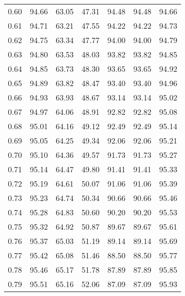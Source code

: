 \begin{tabular}{|c|c|c|c|c|c|c|}
      0.60 &     94.66 &     63.05 &      47.31 &   94.48 &      94.48 &         94.66 \\
      0.61 &     94.71 &     63.21 &      47.55 &   94.22 &      94.22 &         94.73 \\
      0.62 &     94.75 &     63.34 &      47.77 &   94.00 &      94.00 &         94.79 \\
      0.63 &     94.80 &     63.53 &      48.03 &   93.82 &      93.82 &         94.85 \\
      0.64 &     94.85 &     63.73 &      48.30 &   93.65 &      93.65 &         94.92 \\
      0.65 &     94.89 &     63.82 &      48.47 &   93.40 &      93.40 &         94.96 \\
      0.66 &     94.93 &     63.93 &      48.67 &   93.14 &      93.14 &         95.02 \\
      0.67 &     94.97 &     64.06 &      48.91 &   92.82 &      92.82 &         95.08 \\
      0.68 &     95.01 &     64.16 &      49.12 &   92.49 &      92.49 &         95.14 \\
      0.69 &     95.05 &     64.25 &      49.34 &   92.06 &      92.06 &         95.21 \\
      0.70 &     95.10 &     64.36 &      49.57 &   91.73 &      91.73 &         95.27 \\
      0.71 &     95.14 &     64.47 &      49.80 &   91.41 &      91.41 &         95.33 \\
      0.72 &     95.19 &     64.61 &      50.07 &   91.06 &      91.06 &         95.39 \\
      0.73 &     95.23 &     64.74 &      50.34 &   90.66 &      90.66 &         95.46 \\
      0.74 &     95.28 &     64.83 &      50.60 &   90.20 &      90.20 &         95.53 \\
      0.75 &     95.32 &     64.92 &      50.87 &   89.67 &      89.67 &         95.61 \\
      0.76 &     95.37 &     65.03 &      51.19 &   89.14 &      89.14 &         95.69 \\
      0.77 &     95.42 &     65.08 &      51.46 &   88.50 &      88.50 &         95.77 \\
      0.78 &     95.46 &     65.17 &      51.78 &   87.89 &      87.89 &         95.85 \\
      0.79 &     95.51 &     65.16 &      52.06 &   87.09 &      87.09 &         95.93 \\

\end{tabular}

